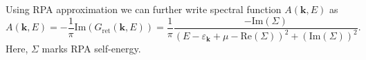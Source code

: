 \documentclass[preprint,prb,amsmath,superscriptaddress,showpacs]{revtex4}
\begin{document}
Using RPA approximation we can further write spectral function
$A(\mathbf{k}, E)$ as
%
\begin{equation}
A(\mathbf{k}, E) = - \frac{1}{\pi} \mathrm{Im} (G_{\mathrm{ret}}(\mathbf{k}, E)) =
\frac{1}{\pi} \frac{-\mathrm{Im}(\Sigma)}{\left( E -
    \varepsilon_{\mathbf{k}} + \mu - \mathrm{Re}(\Sigma) \right)^2 + (\mathrm{Im}(\Sigma))^2}.
\end{equation}
%
Here, $\Sigma$ marks RPA self-energy.


\end{document}
